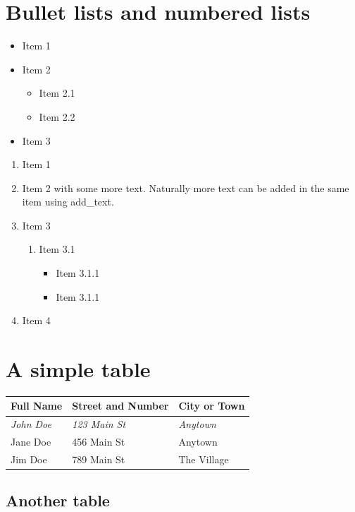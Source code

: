 \documentclass[a4paper]{report}
\begin{document}
\section{Bullet lists and numbered lists}
\begin{itemize}
\item Item 1
\item Item 2
\begin{itemize}
\item Item 2.1
\item Item 2.2
\end{itemize}
\item Item 3
\end{itemize}
\begin{enumerate}
\item Item 1
\item Item 2 with some more text. Naturally more text can be added in the same item using add\_text.
\item Item 3
\begin{enumerate}
\item Item 3.1
\begin{itemize}
\item Item 3.1.1
\item Item 3.1.1
\end{itemize}
\end{enumerate}
\item Item 4
\end{enumerate}

\section{A simple table}

\noindent
\begin{tabular}{lll}
\toprule
\textbf{Full Name} & \textbf{Street and Number} & \textbf{City or Town} \\
\midrule
\textit{John Doe} & \textit{123 Main St} & \textit{Anytown} \\
Jane Doe & 456 Main St & Anytown \\
Jim Doe & 789 Main St & The Village \\
\bottomrule
\end{tabular}
\par\medskip

\subsection{Another table}
\end{document}
